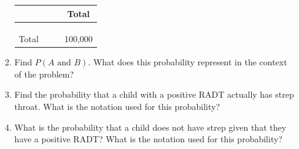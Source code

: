 \documentclass[
]{report}
\begin{document}
\begin{enumerate}
\begin{enumerate}
    \begin{center}
     \renewcommand{\arraystretch}{1.5}
     \begin{tabular}{cccc} \hline
     \hspace{1in} & \hspace{1in} & \hspace{1in} & Total \\ \hline
     & & & \\ 
     & & & \\ 
     & & & \\ \hline
     Total & & & 100,000 \\ \hline
     \end{tabular}
     \end{center}
    \vspace{.1in}
  \item
    Find \(P(A \mbox{ and } B)\). What does this probability represent in the context of the problem?
    \vspace{.8in}
  \item
    Find the probability that a child with a positive RADT actually has strep throat. What is the notation used for this probability?
    \vspace{.8in}
  \item
    What is the probability that a child does not have strep given that they have a positive RADT? What is the notation used for this probability?
  \end{enumerate}
\end{enumerate}

\newpage
\end{document}
